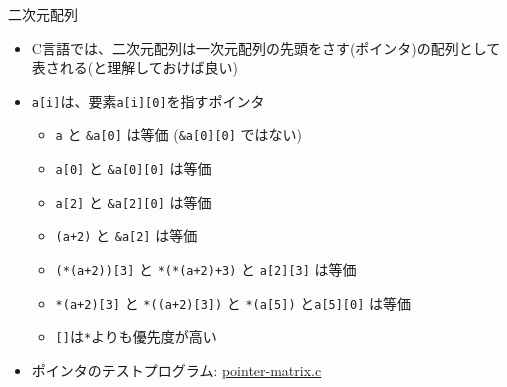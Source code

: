 \begin{frame}[t,fragile]{二次元配列}
  \begin{itemize}
  \item C言語では、二次元配列は一次元配列の先頭をさす(ポインタ)の配列として表される(と理解しておけば良い)
  \item \verb+a[i]+は、要素\verb+a[i][0]+を指すポインタ
    \begin{itemize}
    \item \verb+a+ と \verb+&a[0]+ は等価 (\verb+&a[0][0]+ ではない)
    \item \verb+a[0]+ と \verb+&a[0][0]+ は等価
    \item \verb+a[2]+ と \verb+&a[2][0]+ は等価
    \item \verb^(a+2)^ と \verb^&a[2]^ は等価
    \item \verb^(*(a+2))[3]^ と \verb^*(*(a+2)+3)^ と \verb^a[2][3]^ は等価
    \item \verb^*(a+2)[3]^ と \verb^*((a+2)[3])^ と \verb^*(a[5])^ と\verb^a[5][0]^ は等価
    \item \verb^[]^は\verb^*^よりも優先度が高い
    \end{itemize}
  \item ポインタのテストプログラム: \href{https://github.com/todo-group/computer-experiments/blob/master/exercise/matrix/pointer-matrix.c}{pointer-matrix.c}
  \end{itemize}
\end{frame}
